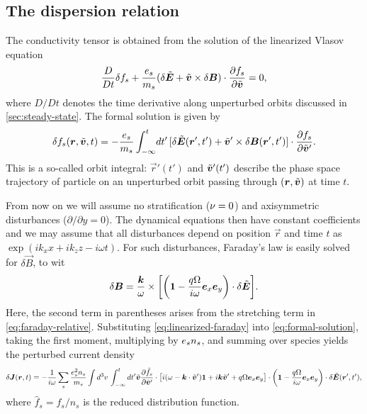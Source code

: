 \documentclass[aps,pre,notitlepage,amsmath,amssymb,amsfonts,nobibnotes,nofootinbib,superscriptaddress]{revtex4-1}
\begin{document}
\subsection{The dispersion relation}
\label{sec:conductivity-tensor}

The conductivity tensor is obtained from the solution of the linearized Vlasov
equation
\begin{equation}
  \label{eq:linear-vlasov-sheet}
  \frac{D}{Dt}\delta f_s
  + \frac{\qs}{m_s}(\delta\tvec{E} + \tvec{v}\times\delta\vec{B})
  \cdot\pder{f_s}{\tvec{v}} = 0,
\end{equation}
where $D/Dt$ denotes the time derivative along unperturbed orbits discussed in
\cref{sec:steady-state}. The formal solution is given by
\begin{equation}
  \label{eq:formal-solution}
  \delta f_s(\vec{r},\tvec{v},t) = -\frac{\qs}{m_s}\int_{-\infty}^t\!dt'\,
  [\delta\tvec{E}(\vec{r}',t') + \tvec{v}'\times\delta\vec{B}(\vec{r}',t')]
  \cdot\pder{f_s}{\tvec{v}'}.
\end{equation}
This is a so-called orbit integral: $\vec{r}'(t')$ and $\tilde{\bm{v}}'(t')$
describe the phase space trajectory of particle on an unperturbed orbit
passing through $(\bm{r},\tilde{\bm{v}})$ at time $t$.

From now on we will assume no stratification ($\nu=0$) and axisymmetric
disturbances ($\partial/\partial{}y=0$). The dynamical equations then have
constant coefficients and we may assume that all disturbances depend on
position $\vec{r}$ and time $t$ as $\exp(ik_x{}x+ik_z{}z-i\omega{}t)$. For
such disturbances, Faraday's law  is easily
solved for $\delta\vec{B}$, to wit
\begin{equation}
  \label{eq:linearized-faraday}
  \delta\vec{B} = \frac{\vec{k}}{\omega}\times\left[
    \left(\mathbf{1} - \frac{q\Omega}{i\omega}\ex\ey\right)
    \cdot\delta\tilde{\vec{E}}
  \right].
\end{equation}
Here, the second term in parentheses arises from the stretching term in
\cref{eq:faraday-relative}. Substituting \cref{eq:linearized-faraday} into
\cref{eq:formal-solution}, taking the first moment, multiplying by $e_s{}n_s$,
and summing over species yields the perturbed current density
\begin{equation}
  \label{eq:perturbed-current}
  \delta\vec{J}(\vec{r},t)
  = -\frac{1}{i\omega}\sums\frac{\qs^2n_s}{m_s}
  \int d^3v\,\int_{-\infty}^t dt'
  \tvec{v}\pder{\hat{f}_s}{\tvec{v}'}\cdot\big[
  i(\omega - \vec{k}\cdot\tvec{v}')\mathbf{1}
  + i\vec{k}\tvec{v}' + q\Omega\ex\ey
  \big]\cdot\left(\mathbf{1} - \frac{q\Omega}{i\omega}\ex\ey\right)
  \cdot\delta\tvec{E}(\vec{r}',t'),
\end{equation}
where $\hat{f}_s=f_s/n_s$ is the reduced distribution function.
\end{document}
